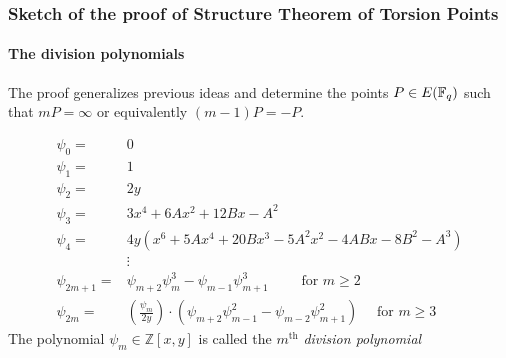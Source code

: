 \documentclass[10pt,handout]{beamer} %
\begin{document}
\begin{frame}\frametitle{Sketch of the proof of Structure Theorem of Torsion Points}
\framesubtitle{The division polynomials}\pause

The proof generalizes previous ideas and determine the points $P\in E(\mathbb F_q)$ such that
$mP=\infty$ or equivalently $(m-1)P=-P$.


\begin{Definition}[Division Polynomials of $E:y^2=x^3+Ax+B$ ($p>3$)]\vspace*{-0.7cm}
\begin{align*}
        \psi_{0} =& 0\\
        \psi_{1} =& 1\\
        \psi_{2} =& 2y\\
        \psi_{3} =& 3x^{4} + 6Ax^{2} + 12Bx - A^{2}\\
        \psi_{4} =& 4y(x^{6} + 5Ax^{4} + 20Bx^{3} - 5A^{2}x^{2} - 4ABx - 8B^{2} - A^{3}) \\
        &\vdots\\
        \psi_{2m+1} =& \psi_{m+2}\psi_{m}^{3}-\psi_{m-1}\psi^{3}_{m+1} \qquad \text{ for } m \geq 2\\
        \psi_{2m}  =& \left(\frac{\psi_{m}}{2y}\right)\cdot(\psi_{m+2}\psi^{2}_{m-1}-\psi_{m-2}\psi^{2}_{m+1}) \quad \text{ for } m \geq 3
\end{align*}
The polynomial $\psi_m\in{\mathbb Z}[x,y]$ is called the $m^{\text{th}}$ \emph{division polynomial}
\end{Definition}

\end{frame}
\end{document}
